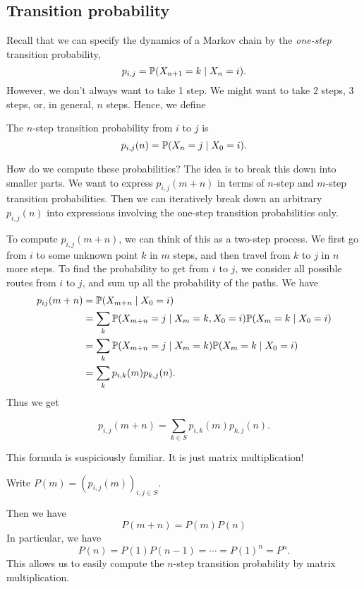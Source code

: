 \documentclass[a4paper]{article}
\begin{document}
\subsection{Transition probability}
Recall that we can specify the dynamics of a Markov chain by the \emph{one-step} transition probability,
\[
  p_{i, j} = \P(X_{n + 1} = k\mid X_n = i).
\]
However, we don't always want to take 1 step. We might want to take 2 steps, 3 steps, or, in general, $n$ steps. Hence, we define
\begin{defi}
  The $n$-step transition probability from $i$ to $j$ is
  \[
    p_{i, j}(n) = \P(X_n = j\mid X_0 = i).
  \]
\end{defi}
How do we compute these probabilities? The idea is to break this down into smaller parts. We want to express $p_{i, j}(m + n)$ in terms of $n$-step and $m$-step transition probabilities. Then we can iteratively break down an arbitrary $p_{i, j}(n)$ into expressions involving the one-step transition probabilities only.

To compute $p_{i, j}(m + n)$, we can think of this as a two-step process. We first go from $i$ to some unknown point $k$ in $m$ steps, and then travel from $k$ to $j$ in $n$ more steps. To find the probability to get from $i$ to $j$, we consider all possible routes from $i$ to $j$, and sum up all the probability of the paths. We have
\begin{align*}
  p_{ij}(m + n) &= \P(X_{m + n}\mid X_0 = i)\\
  &= \sum_k \P(X_{m + n} = j\mid X_m = k, X_0 = i)\P(X_m = k\mid X_0 = i)\\
  &= \sum_k \P(X_{m + n} = j\mid X_m = k)\P(X_m = k \mid X_0 = i)\\
  &= \sum_k p_{i, k}(m)p_{k, j}(n).
\end{align*}
Thus we get
\begin{thm}
  \[
    p_{i, j}(m + n) = \sum_{k\in S} p_{i, k}(m) p_{k, j}(n).
  \]
\end{thm}
This formula is suspiciously familiar. It is just matrix multiplication!

\begin{notation}
  Write $P(m) = (p_{i, j}(m))_{i, j\in S}$.
\end{notation}
Then we have
\[
  P(m + n) = P(m)P(n)
\]
In particular, we have
\[
  P(n) = P(1)P(n - 1) = \cdots = P(1)^n = P^n.
\]
This allows us to easily compute the $n$-step transition probability by matrix multiplication.
\end{document}
